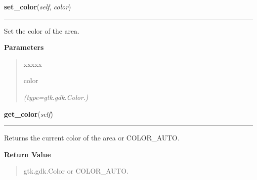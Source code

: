     \label{pygtk_chart:chart:Area:set_color}

    \vspace{0.5ex}

\hspace{.8\funcindent}\begin{boxedminipage}{\funcwidth}

    \raggedright \textbf{set\_color}(\textit{self}, \textit{color})

    \vspace{-1.5ex}

    \rule{\textwidth}{0.5\fboxrule}
\setlength{\parskip}{2ex}
    Set the color of the area.

\setlength{\parskip}{1ex}
      \textbf{Parameters}
      \vspace{-1ex}

      \begin{quote}
        \begin{Ventry}{xxxxx}

          \item[color]

            {\it (type=gtk.gdk.Color.)}

        \end{Ventry}

      \end{quote}

    \end{boxedminipage}

    \label{pygtk_chart:chart:Area:get_color}

    \vspace{0.5ex}

\hspace{.8\funcindent}\begin{boxedminipage}{\funcwidth}

    \raggedright \textbf{get\_color}(\textit{self})

    \vspace{-1.5ex}

    \rule{\textwidth}{0.5\fboxrule}
\setlength{\parskip}{2ex}
    Returns the current color of the area or COLOR\_AUTO.

\setlength{\parskip}{1ex}
      \textbf{Return Value}
    \vspace{-1ex}

      \begin{quote}
      gtk.gdk.Color or COLOR\_AUTO.

      \end{quote}

    \end{boxedminipage}

